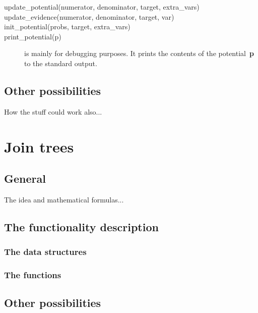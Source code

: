 \documentclass[12pt,a4paper]{report}
\begin{document}
\begin{description}
\item[update\_potential(numerator, denominator, target, extra\_vars)] 


\item[update\_evidence(numerator, denominator, target, var)] 


\item[init\_potential(probs, target, extra\_vars)] 


\item[print\_potential(p)] is mainly for debugging purposes. It prints 
the contents of the potential~\textbf{p} to the standard output.

\end{description}


\subsection{Other possibilities}

How the stuff could work also...


\newpage
\section{Join trees} %
\subsection{General}

The idea and mathematical formulas...

\subsection{The functionality description}
\subsubsection{The data structures}




\subsubsection{The functions}


\subsection{Other possibilities}
\end{document}
